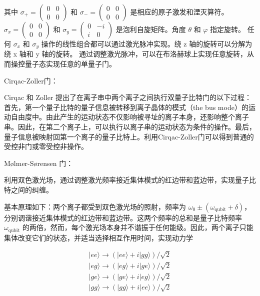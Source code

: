 其中 $\sigma_+ = \begin{pmatrix} 0 & 0 \\ 0 & 0 \end{pmatrix}$ 和 $\sigma_- = \begin{pmatrix} 0 & 0 \\ 0 & 0 \end{pmatrix}$ 是相应的原子激发和湮灭算符。$\sigma_x = \begin{pmatrix} 0 & 0 \\ 0 & 0 \end{pmatrix}$ 和 $\sigma_y = \begin{pmatrix} 0 & -i \\ i & 0 \end{pmatrix}$ 是泡利自旋矩阵。角度 $\theta$ 和 $\varphi$ 指定旋转。
任何 $\sigma_x$ 和 $\sigma_y$ 操作的线性组合都可以通过激光脉冲实现。绕 z 轴的旋转可以分解为绕 x 轴和 y 轴的旋转。
通过调整激光脉冲，可以在布洛赫球上实现任意旋转，从而操控量子态实现任意的单量子门。


Cirqac-Zoller门：

Cirqac 和 Zoller 提出了在离子串中两个离子之间执行双量子比特门的以下过程：首先，第一个量子比特的量子信息被转移到离子晶体的模式（the bus mode）的运动自由度中。由此产生的运动状态不仅影响被寻址的离子本身，还影响整个离子串。因此，在第二个离子上，可以执行以离子串的运动状态为条件的操作。最后，量子信息被映射回第一个离子的量子比特上。利用Cirqac-Zoller门可以得到普通的受控非门或零受控非操作。


M\o{}lmer-S\o{rensen} 门：

利用双色激光场，通过调整激光频率接近集体模式的红边带和蓝边带，实现量子比特之间的纠缠。

基本原理如下：两个离子都受到双色激光场的照射，频率为 $\omega_0 \pm (\omega_{\text{qubit}} + \delta)$，分别调谐接近集体模式的红边带和蓝边带。这两个频率的总和是量子比特频率 $\omega_{\text{qubit}}$ 的两倍，然而，每个激光场本身并不谐振于任何能级。因此，两个离子只能集体改变它们的状态，并适当选择相互作用时间，实现动力学

\[
\begin{array}{l}
|ee\rangle \rightarrow (|ee\rangle + i|gg\rangle)/\sqrt{2} \\
|eg\rangle \rightarrow (|eg\rangle + i|ge\rangle)/\sqrt{2} \\
|ge\rangle \rightarrow (|ge\rangle + i|eg\rangle)/\sqrt{2} \\
|gg\rangle \rightarrow (|gg\rangle + i|ee\rangle)/\sqrt{2}
\end{array}
\] 

